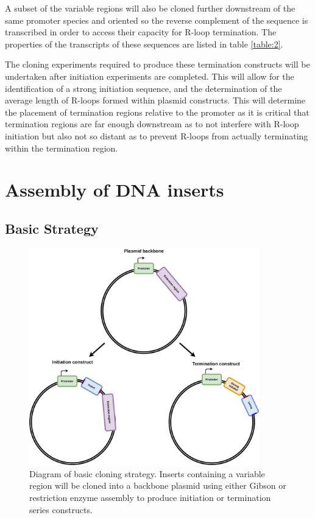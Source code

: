 \documentclass[11pt]{article}
\begin{document}


A subset of the variable regions will also be cloned further downstream of the same promoter species and oriented so the reverse complement of the sequence is transcribed in order to access their capacity for R-loop termination. The properties of the transcripts of these sequences are listed in table \ref{table:2}. 



The cloning experiments required to produce these termination constructs will be undertaken after initiation experiments are completed. This will allow for the identification of a strong initiation sequence, and the determination of the average length of R-loops formed within plasmid constructs. This will determine the placement of termination regions relative to the promoter as it is critical that termination regions are far enough downstream as to not interfere with R-loop initiation but also not so distant as to prevent R-loops from actually terminating within the termination region.





\section{Assembly of DNA inserts}

\subsection{Basic Strategy}

\begin{figure}[H]
	\includegraphics[width=10cm]{images/construct_diagram.png}
	\centering
	\caption{Diagram of basic cloning strategy. Inserts containing a variable region will be cloned into a backbone plasmid using either Gibson or restriction enzyme assembly to produce initiation or termination series constructs.}
\end{figure}
\end{document}
